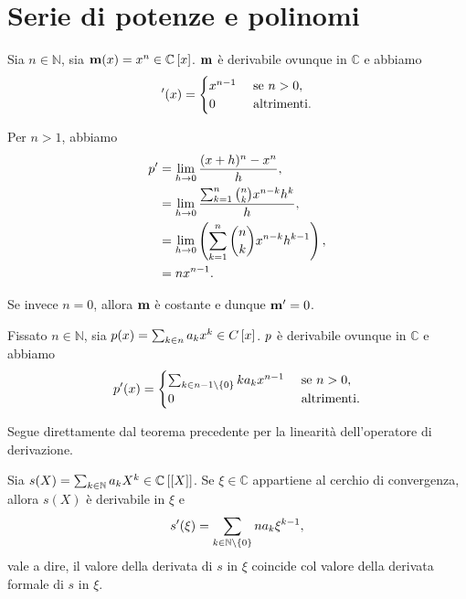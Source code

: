 \section{Serie di potenze e polinomi}
\label{FunzioniNotevoli_SerieDiPotenzePolinomi}
\begin{Theorem}
	Sia $n \in \mathbb{N}$, sia $\mathbf{m}(x) = x^n \in \mathbb{C} \left [ x \right ]$. $\mathbf{m}$ \`e derivabile ovunque in $\mathbb{C}$ e abbiamo
	\[
		\mathbf{'}(x) =
		\begin{cases}
			x^{n - 1}&\text{ se }n > 0,\\
			0&\text{ altrimenti}.
		\end{cases}
	\]
\end{Theorem}
\Proof Per $n > 1$, abbiamo
\begin{align*}
	p'
	&= \lim_{h \rightarrow 0} \frac{(x + h)^n - x^n}{h},\\
	&= \lim_{h \rightarrow 0} \frac{\sum_{k = 1}^n \binom{n}{k} x^{n - k}h^k}{h},\\
	&= \lim_{h \rightarrow 0} \left ( \sum_{k = 1}^n \binom{n}{k} x^{n - k}h^{k - 1} \right ),\\
	&= n x^{n - 1}.
\end{align*}
\par Se invece $n = 0$, allora $\mathbf{m}$ \`e costante e dunque $\mathbf{m}' = 0$. \EndProof
\begin{Corollary}
	Fissato $n \in \mathbb{N}$, sia $p(x) = \sum_{k \in n} a_k x^k \in C \left [ x \right ]$. $p$ \`e derivabile ovunque in $\mathbb{C}$ e abbiamo
	\[
		p'(x) =
		\begin{cases}
			\sum_{k \in n - 1 \setminus \lbrace 0 \rbrace} k a_k x^{n - 1}&\text{ se }n > 0,\\
			0&\text{ altrimenti}.
		\end{cases}
	\]
\end{Corollary}
\Proof Segue direttamente dal teorema precedente per la linearit\`a dell'operatore di derivazione. \EndProof
\begin{Corollary}
	Sia $s(X) = \sum_{k \in \mathbb{N}} a_k X^k \in \mathbb{C} \left [ \left [ X \right ] \right ]$. Se $\xi \in \mathbb{C}$ appartiene al cerchio di convergenza, allora $s(X)$ \`e derivabile in $\xi$ e
	\[
	s'(\xi) = \sum_{k \in \mathbb{N} \setminus \lbrace 0 \rbrace} n a_k \xi^{k - 1},
	\]
	vale a dire, il valore della derivata di $s$ in $\xi$ coincide col valore della derivata formale di $s$ in $\xi$.
\end{Corollary}
